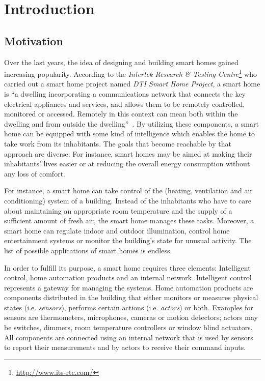\chapter{Introduction}
\label{ch:intro}

\section{Motivation}

Over the last years, the idea of designing and building smart homes gained increasing popularity. According to the \emph{Intertek Research \& Testing Centre}\footnote{\href{http://www.its-rtc.com/}{http://www.its-rtc.com/}} who carried out a smart home project named \emph{DTI Smart Home Project}, a smart home is ``a dwelling incorporating a communications network that connects the key electrical appliances and services, and allows them to be remotely controlled, monitored or accessed. Remotely in this context can mean both within the dwelling and from outside the dwelling''~\cite{SmartHomeDefinition,SmartHomeResearch}. By utilizing these components, a smart home can be equipped with some kind of intelligence which enables the home to take work from its inhabitants. The goals that become reachable by that approach are diverse: For instance, smart homes may be aimed at making their inhabitants' lives easier or at reducing the overall energy consumption without any loss of comfort. %

For instance, a smart home can take control of the  (heating, ventilation and air conditioning) system of a building. Instead of the inhabitants who have to care about maintaining an appropriate room temperature and the supply of a sufficient amount of fresh air, the smart home manages these tasks. Moreover, a smart home can regulate indoor and outdoor illumination, control home entertainment systems or monitor the building's state for unusual activity. The list of possible applications of smart homes is endless.

In order to fulfill its purpose, a smart home requires three elements: Intelligent control, home automation products and an internal network. Intelligent control represents a gateway for managing the systems. Home automation products are components distributed in the building that either monitors or measures physical states (i.e. \emph{sensors}), performs certain actions (i.e. \emph{actors}) or both. Examples for sensors are thermometers, microphones, cameras or motion detectors; actors may be switches, dimmers, room temperature controllers or window blind actuators. All components are connected using an internal network that is used by sensors to report their measurements and by actors to receive their command inputs.

